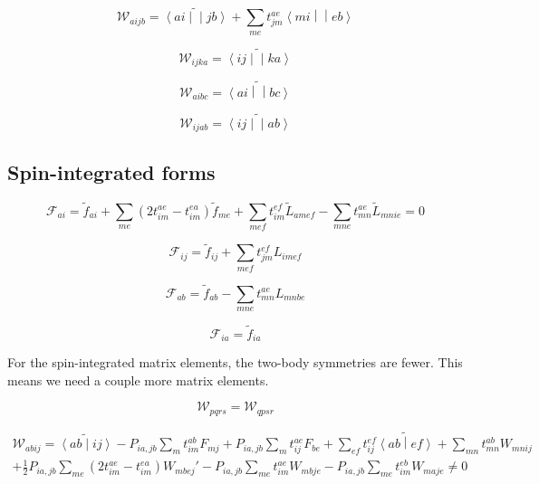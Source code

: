 \documentclass{article}
\newcommand{\tei}[2]{\left<{#1}\middle|\middle|{#2}\right>}
\begin{document}
\begin{equation}
  \mathcal{W}_{aijb} = \widetilde{\tei{ai}{jb}} + \sum_{me}t_{jm}^{ae}\tei{mi}{eb}
\end{equation}

\begin{equation}
  \mathcal{W}_{ijka} = \widetilde{\tei{ij}{ka}}
\end{equation}

\begin{equation}
  \mathcal{W}_{aibc} = \widetilde{\tei{ai}{bc}}
\end{equation}

\begin{equation}
  \mathcal{W}_{ijab} = \widetilde{\tei{ij}{ab}}
\end{equation}

\subsection{Spin-integrated forms}

\begin{equation}
  \mathcal{F}_{ai} = \tilde{f}_{ai} + \sum_{me}\left(2t_{im}^{ae} - t_{im}^{ea}\right)\tilde{f}_{me} + \sum_{mef}t_{im}^{ef}\tilde{L}_{amef} - \sum_{mne}t_{mn}^{ae}\tilde{L}_{mnie} = 0
\end{equation}

\begin{equation}
  \mathcal{F}_{ij} = \tilde{f}_{ij} + \sum_{mef}t_{jm}^{ef}L_{imef}
\end{equation}

\begin{equation}
  \mathcal{F}_{ab} = \tilde{f}_{ab} - \sum_{mne}t_{mn}^{ae} L_{mnbe}
\end{equation}

\begin{equation}
  \mathcal{F}_{ia} = \tilde{f}_{ia}
\end{equation}

For the spin-integrated matrix elements, the two-body symmetries are fewer. This means we need a couple more matrix elements.

\begin{equation}
  \mathcal{W}_{pqrs} = \mathcal{W}_{qpsr}
\end{equation}

\begin{multline}
  \mathcal{W}_{abij} = \widetilde{\left<ab\middle|ij\right>} - P_{ia,jb}\sum_mt_{im}^{ab}F_{mj} + P_{ia,jb}\sum_mt_{ij}^{ae}F_{be} + \sum_{ef}t_{ij}^{ef}\widetilde{\left<ab\middle|ef\right>} + \sum_{mn}t_{mn}^{ab}W_{mnij} \\
  + \frac{1}{2}P_{ia,jb}\sum_{me}\left(2t_{im}^{ae} - t_{im}^{ea}\right)W_{mbej}' - P_{ia,jb}\sum_{me}t_{im}^{ae}W_{mbje} - P_{ia,jb}\sum_{me}t_{im}^{eb}W_{maje} \ne 0
\end{multline}
\end{document}
